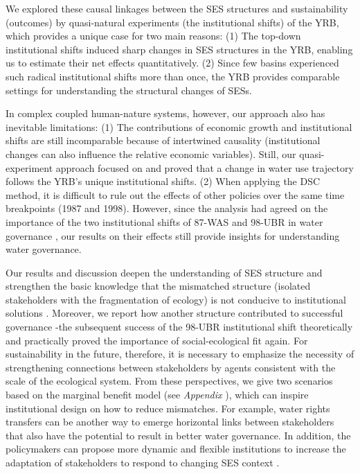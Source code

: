 We explored these causal linkages between the SES structures and sustainability (outcomes) by quasi-natural experiments (the institutional shifts) of the YRB, which provides a unique case for two main reasons:
(1) The top-down institutional shifts induced sharp changes in SES structures in the YRB, enabling us to estimate their net effects quantitatively.
(2) Since few basins experienced such radical institutional shifts more than once, the YRB provides comparable settings for understanding the structural changes of SESs.

In complex coupled human-nature systems, however, our approach also has inevitable limitations:
(1) The contributions of economic growth and institutional shifts are still incomparable because of intertwined causality (institutional changes can also influence the relative economic variables).
Still, our quasi-experiment approach focused on and proved that a change in water use trajectory follows the YRB's unique institutional shifts.
(2) When applying the DSC method, it is difficult to rule out the effects of other policies over the same time breakpoints (1987 and 1998).
However, since the analysis had agreed on the importance of the two institutional shifts of 87-WAS and 98-UBR in water governance \cite{wang2012b}, our results on their effects still provide insights for understanding water governance.

Our results and discussion deepen the understanding of SES structure and strengthen the basic knowledge that the mismatched structure (isolated stakeholders with the fragmentation of ecology) is not conducive to institutional solutions \cite{bodin2017b, ostrom2009, reyers2018}.
Moreover, we report how another structure contributed to successful governance -the subsequent success of the 98-UBR institutional shift theoretically and practically proved the importance of social-ecological fit again.
For sustainability in the future, therefore, it is necessary to emphasize the necessity of strengthening connections between stakeholders by agents consistent with the scale of the ecological system.
From these perspectives, we give two scenarios based on the marginal benefit model (see \textit{Appendix }), which can inspire institutional design on how to reduce mismatches.
For example, water rights transfers can be another way to emerge horizontal links between stakeholders that also have the potential to result in better water governance.
In addition, the policymakers can propose more dynamic and flexible institutions to increase the adaptation of stakeholders to respond to changing SES context \cite{reyers2018}.


